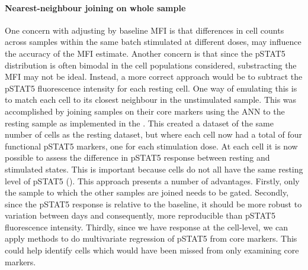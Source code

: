 \paragraph{\label{paragraph:ANN} Nearest-neighbour joining on whole sample}
One concern with adjusting by baseline MFI is that differences in cell counts across samples within the same batch stimulated at different doses, may influence the accuracy of the MFI estimate.
Another concern is that since the pSTAT5 distribution is often bimodal in the cell populations considered, substracting the MFI may not be ideal.
Instead, a more correct approach would be to subtract the pSTAT5 fluorescence intensity for each resting cell.
One way of emulating this is to match each cell to its closest neighbour in the unstimulated sample.  
This was accomplished by joining samples on their core markers using the \gls{ANN} to the resting sample \citep{Jones:2011ez}
as implemented in the .
This created a dataset of the same number of cells as the resting dataset, but where each cell now had a total of four functional pSTAT5 markers,
one for each stimulation dose.
At each cell it is now possible to assess the difference in pSTAT5 response between resting and stimulated states.
This is important because cells do not all have the same resting level of pSTAT5 ().
This approach presents a number of advantages.
Firstly, only the sample to which the other samples are joined needs to be gated.
Secondly, since the pSTAT5 response is relative to the baseline, it should be more robust to variation between days
and consequently, more reproducible than pSTAT5 fluorescence intensity.
Thirdly, since we have response at the cell-level, we can apply methods
to do multivariate regression of pSTAT5 from core markers.
This could help identify cells which would have been missed from only examining core markers.
